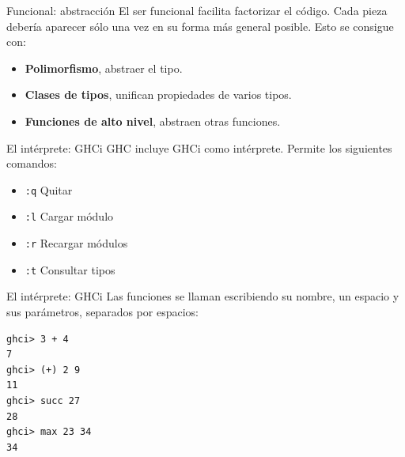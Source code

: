 \begin{frame}[fragile]{Funcional: abstracción}
  El ser funcional facilita factorizar el código. Cada
  pieza debería aparecer sólo una vez en su forma más
  general posible. Esto se consigue con:

  \begin{itemize}
   \item \textbf{Polimorfismo}, abstraer el tipo.
   \item \textbf{Clases de tipos}, unifican propiedades de varios tipos.
   \item \textbf{Funciones de alto nivel}, abstraen otras funciones.
  \end{itemize}

\end{frame}

\begin{frame}{El intérprete: GHCi}
  GHC incluye GHCi como intérprete. Permite los siguientes comandos:
  \espacio
  \begin{itemize}
    \item \texttt{:q} \qquad  Quitar
    \item \texttt{:l} \qquad  Cargar módulo
    \item \texttt{:r} \qquad  Recargar módulos
    \item \texttt{:t} \qquad  Consultar tipos
  \end{itemize}

\end{frame}

\begin{frame}[fragile]{El intérprete: GHCi}
 Las funciones se llaman escribiendo su nombre, un espacio y sus parámetros, separados por espacios:
\espacio
  \begin{lstlisting}
ghci> 3 + 4
7
ghci> (+) 2 9
11
ghci> succ 27
28
ghci> max 23 34
34
  \end{lstlisting}

\end{frame}
